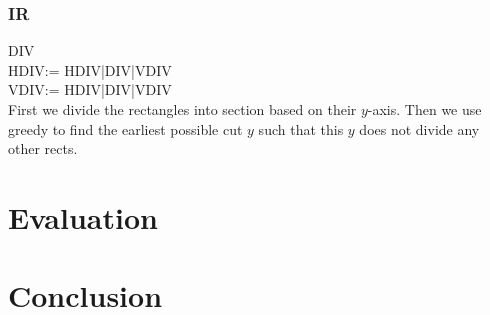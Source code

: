 \documentclass[runningheads]{llncs}
\begin{document}
\subsubsection{IR}
DIV\\
HDIV:= HDIV|DIV|VDIV\\
VDIV:= HDIV|DIV|VDIV\\
First we divide the rectangles into section based on their $y$-axis. Then we use
greedy to find the earliest possible cut $y$ such that this $y$ does not divide any
other rects.


\section{Evaluation}
\section{Conclusion}
\end{document}
